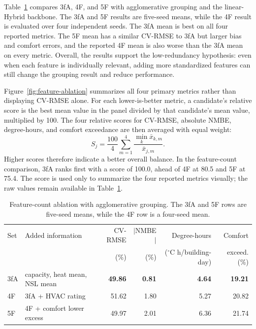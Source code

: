 Table~\ref{tab:feature-count} compares 3fA, 4F, and 5F with agglomerative
grouping and the linear-Hybrid backbone. The 3fA and 5F results are five-seed
means, while the 4F result is evaluated over four independent seeds. The 3fA
mean is best on all four reported metrics.
The 5F mean has a similar CV-RMSE to 3fA but larger bias and comfort errors, and
the reported 4F mean is also worse than the 3fA mean on every metric. Overall,
the results support the low-redundancy hypothesis: even when each feature is
individually relevant, adding more standardized features can still change the
grouping result and reduce performance.

Figure~\ref{fig:feature-ablation} summarizes all four primary metrics rather
than displaying CV-RMSE alone. For each lower-is-better metric, a candidate's
relative score is the best mean value in the panel divided by that candidate's
mean value, multiplied by 100. The four relative scores for CV-RMSE, absolute
NMBE, degree-hours, and comfort exceedance are then averaged with equal weight:
\begin{equation}
S_j=\frac{100}{4}\sum_{m=1}^{4}
\frac{\min_k \bar{x}_{k,m}}{\bar{x}_{j,m}}.
\label{eq:feature-ablation-score}
\end{equation}
Higher scores therefore indicate a better overall balance. In the feature-count
comparison, 3fA ranks first with a score of 100.0, ahead of 4F at 80.5 and 5F at
75.4. The score is used only to summarize the four reported metrics visually;
the raw values remain available in Table~\ref{tab:feature-count}.

\begin{table}[!htbp]
\small
\begin{center}
\begin{tabular}{|l|l|r|r|r|r|}
\hline
Set & Added information & CV-RMSE & $|$NMBE$|$ & Degree-hours & Comfort \\
 & & (\%) & (\%) & ($^\circ$C h/building-day) & exceed. (\%) \\
\hline
3fA & capacity, heat mean, NSL mean & \textbf{49.86} & \textbf{0.81} & \textbf{4.64} & \textbf{19.21} \\
4F & 3fA + HVAC rating & 51.62 & 1.80 & 5.27 & 20.82 \\
5F & 4F + comfort lower excess & 49.97 & 2.01 & 6.36 & 21.74 \\
\hline
\end{tabular}
\end{center}
\caption{Feature-count ablation with agglomerative grouping. The 3fA and 5F
rows are five-seed means, while the 4F row is a four-seed mean.}
\label{tab:feature-count}
\end{table}

